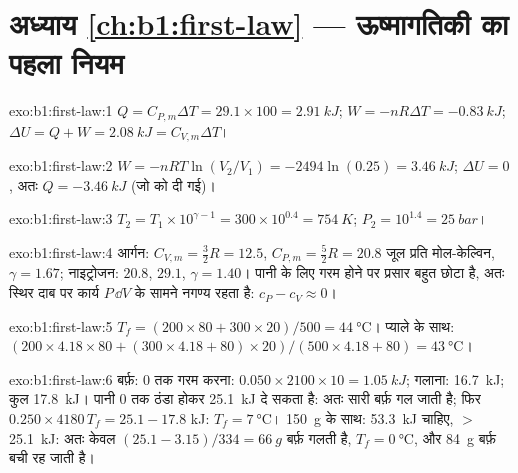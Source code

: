 \section*{अध्याय \ref{ch:b1:first-law} --- ऊष्मागतिकी का पहला नियम}

\begin{solution}{exo:b1:first-law:1}
$Q = C_{P,m}\Delta T = 29.1 \times 100 = \qty{2.91}{kJ}$; $W = -nR\Delta T =
\qty{-0.83}{kJ}$; $\Delta U = Q + W = \qty{2.08}{kJ} = C_{V,m}\Delta T$।
\end{solution}

\begin{solution}{exo:b1:first-law:2}
$W = -nRT\ln(V_2/V_1) = -2494\ln(0.25) = \qty{+3.46}{kJ}$; $\Delta U = 0$, अतः
$Q = \qty{-3.46}{kJ}$ (जो  को दी गई)।
\end{solution}

\begin{solution}{exo:b1:first-law:3}
$T_2 = T_1 \times 10^{\gamma - 1} = 300 \times 10^{0.4} = \qty{754}{K}$; $P_2 =
10^{1.4} = \qty{25}{bar}$।
\end{solution}

\begin{solution}{exo:b1:first-law:4}
आर्गन: $C_{V,m} = \tfrac32 R = 12.5$, $C_{P,m} = \tfrac52 R = 20.8$ जूल प्रति मोल-केल्विन,
$\gamma = 1.67$; नाइट्रोजन: $20.8$, $29.1$, $\gamma = 1.40$। पानी के लिए गरम
होने पर प्रसार बहुत छोटा है, अतः स्थिर दाब पर कार्य $P\,\dd V$  के
सामने नगण्य रहता है: $c_P - c_V \approx 0$।
\end{solution}

\begin{solution}{exo:b1:first-law:5}
$T_f = (200 \times 80 + 300 \times 20)/500 = \qty{44}{\degreeCelsius}$। प्याले
के साथ: $(200 \times 4.18 \times 80 + (300 \times 4.18 + 80) \times 20)/(500 \times
4.18 + 80) = \qty{43}{\degreeCelsius}$।
\end{solution}

\begin{solution}{exo:b1:first-law:6}
बर्फ़: $0$ तक गरम करना: $0.050 \times 2100 \times 10 = \qty{1.05}{kJ}$; गलाना:
\qty{16.7}{kJ}; कुल \qty{17.8}{kJ}। पानी $0$ तक ठंडा होकर \qty{25.1}{kJ} दे
सकता है: अतः सारी बर्फ़ गल जाती है; फिर $0.250 \times 4180\,T_f = 25.1 - 17.8$ kJ: $T_f =
\qty{7}{\degreeCelsius}$। \qty{150}{g} के साथ: \qty{53.3}{kJ} चाहिए, $>$ \qty{25.1}{kJ}:
अतः केवल $(25.1 - 3.15)/334 = \qty{66}{g}$ बर्फ़ गलती है, $T_f = \qty{0}{\degreeCelsius}$,
और \qty{84}{g} बर्फ़ बची रह जाती है।
\end{solution}

